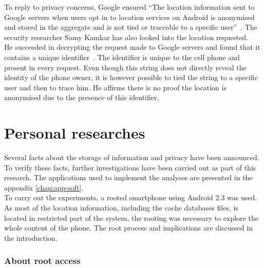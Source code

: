 To reply to privacy concerns, Google ensured ``The location information sent to Google servers when users opt in to location services on Android is anonymised and stored in the aggregate and is not tied or traceable to a specific user''~\cite{loc-not-traceable}.
The security researcher Samy Kamkar has also looked into the location requested.\\


He succeeded in decrypting the request made to Google servers and found that it contains a unique identifier~\cite{cnet-andr-samy}.
The identifier is unique to the cell phone and present in every request.
Even though this string does not directly reveal the identity of the phone owner, it is however possible to tied the string to a specific user and then to trace him.
He affirms there is no proof the location is anonymised due to the presence of this identifier.\\

\section{Personal researches}
\label{sec:andro-perso-research}

Several facts about the storage of information and privacy have been announced.
To verify these facts, further investigations have been carried out as part of this research.
The applications used to implement the analyses are presented in the appendix \ref{chap:app-soft}.\\

To carry out the experiments, a rooted smartphone using Android 2.3 was used.
As most of the location information, including the cache databases files, is located in restricted part of the system, the rooting was necessary to explore the whole content of the phone.
The root process and implications are discussed in the introduction.

\subsubsection*{About root access}

